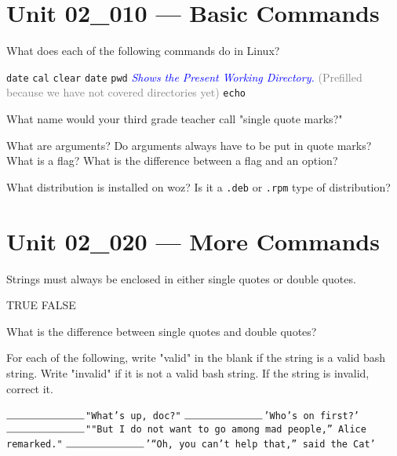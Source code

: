 \documentclass[letterpaper,12pt]{exam}
\newcommand{\unit}{Unit 02}
\begin{document}
\begin {questions}

\section*{\unit\_010 --- Basic Commands} %

\begin{samepage}
	\question What does each of the following commands do in Linux?
	\begin{checkboxes}
		\choice \texttt{{\huge date}}
		\choice \texttt{{\huge cal}}
		\choice \texttt{{\huge clear}}
		\choice \texttt{{\huge date}}
		\choice \texttt{{\huge pwd}} \textcolor{blue}{\textsl{Shows the Present Working Directory.}} \textcolor{gray}{(Prefilled because we have not covered directories yet)}
		\choice \texttt{{\huge echo}}
	\end{checkboxes}
	\end{samepage}

\question What name would your third grade teacher call "single quote marks?" 
\vspace{1.25cm}

\question What are arguments?  Do arguments always have to be put in quote marks? 
\vspace{1.25cm}
\question What is a flag?  What is the difference between a flag and an option? 

\question What distribution is installed on woz?  Is it a \texttt{.deb} or \texttt{.rpm} type of distribution? 

\section*{\unit\_020 --- More Commands} %

\begin{samepage}
\question Strings must always be enclosed in either single quotes or double quotes.
\begin{checkboxes}
\choice TRUE
\choice FALSE
\end{checkboxes}
\end{samepage}

\question What is the difference between single quotes and double quotes? 
\vspace{1.25cm}

\begin{samepage}
\question For each of the following, write "valid" in the blank if the string is a valid bash string. Write "invalid" if it is not a valid bash string. If the string is invalid, correct it.
\begin{checkboxes}
	\choice $\rule{2.5cm}{0.15mm}$\texttt{\Large "What's up, doc?"}
	\choice $\rule{2.5cm}{0.15mm}$\texttt{\Large 'Who's on first?'}
	\choice $\rule{2.5cm}{0.15mm}$\texttt{\Large ""But I do not want to go among mad people,” Alice remarked."}
	\choice $\rule{2.5cm}{0.15mm}$\texttt{\Large '“Oh, you can’t help that,” said the Cat'}


\end{checkboxes}
\end{samepage}
\end{questions}
\end{document}
